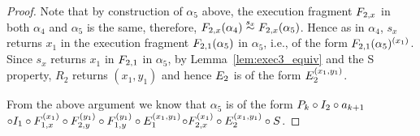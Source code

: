 {\begin{proof}
Note that by construction of $\alpha_5$ above,  the execution fragment  $\fragt{F_{2,x}}{\alpha_4}{}$ in both $\alpha_4$ and $\alpha_5$ is the same, therefore,   $\frage{F_{2,x}}{\alpha_4}{} \stackrel{s_x}{\sim} \frage{F_{2,x}}{\alpha_5}{}$. Hence as in 
$\alpha_4$,  $s_x$  returns $x_1$  in the execution fragment  $\frage{F_{2, 1}}{\alpha_5}{}$  in   $\alpha_5$,  i.e.,  of the form $\frage{F_{2, 1}}{\alpha_5}{x_1}$.
Since $s_x$ returns $x_1$ in $\fragt{F_{2, 1}}{\alpha_5}{}$ in $\alpha_5$,  by   
Lemma~\ref{lem:exec3_equiv}  and   the S property,
  $R_2$ returns $(x_1, y_1)$  and hence $\fragt{E_2}{\alpha_5}{}$ is of the form $\fragt{E_2}{\alpha_5}{x_1, y_1}$.

From the above argument we know that  $\alpha_5$ is of the form $ \finiteprefixA{k-1}{k} \circ \fragt{I_2}{\alpha_5}{}  \circ a_{k+1} $$ \circ \fragt{I_1}{\alpha_5}{}
\circ \fragt{F_{1,x}}{\alpha_5}{x_1} \circ \fragt{F_{2,y}}{\alpha_5}{y_1} \circ  \fragt{F_{1,y}}{\alpha_5}{y_1} \circ \fragt{E_1}{\alpha_5}{x_1, y_1}
$$\circ \fragt{F_{2,x}}{\alpha_5}{x_1} \circ  \fragt{E_2}{\alpha_5}{x_1, y_1}\circ \fragt{S}{\alpha_5}{}$.
\end{proof}
}
